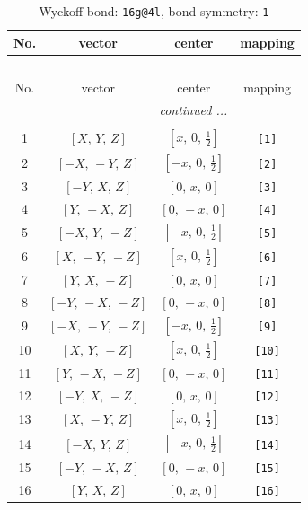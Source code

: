 \documentclass[fleqn,8pt]{jsarticle}
\begin{document}
\begin{longtable}{cccc}
\caption{Wyckoff bond: {\tt 16g@4l}, bond symmetry: {\tt 1}}
 \\
 \hline \hline
No. & vector & center & mapping \\ \hline \endfirsthead

\multicolumn{3}{l}{\tablename\ \thetable{}} \\
 \hline \hline
No. & vector & center & mapping \\ \hline \endhead

 \hline \hline
\multicolumn{3}{r}{\footnotesize\it continued ...} \\ \endfoot

 \hline \hline
\multicolumn{3}{r}{} \\ \endlastfoot

1 & $\left[ X,\, Y,\, Z \right]$ & $\left[ x,\, 0,\, \frac{1}{2} \right]$ & {\tt [1]} \\ \hline
2 & $\left[ - X,\, - Y,\, Z \right]$ & $\left[ - x,\, 0,\, \frac{1}{2} \right]$ & {\tt [2]} \\ \hline
3 & $\left[ - Y,\, X,\, Z \right]$ & $\left[ 0,\, x,\, 0 \right]$ & {\tt [3]} \\ \hline
4 & $\left[ Y,\, - X,\, Z \right]$ & $\left[ 0,\, - x,\, 0 \right]$ & {\tt [4]} \\ \hline
5 & $\left[ - X,\, Y,\, - Z \right]$ & $\left[ - x,\, 0,\, \frac{1}{2} \right]$ & {\tt [5]} \\ \hline
6 & $\left[ X,\, - Y,\, - Z \right]$ & $\left[ x,\, 0,\, \frac{1}{2} \right]$ & {\tt [6]} \\ \hline
7 & $\left[ Y,\, X,\, - Z \right]$ & $\left[ 0,\, x,\, 0 \right]$ & {\tt [7]} \\ \hline
8 & $\left[ - Y,\, - X,\, - Z \right]$ & $\left[ 0,\, - x,\, 0 \right]$ & {\tt [8]} \\ \hline
9 & $\left[ - X,\, - Y,\, - Z \right]$ & $\left[ - x,\, 0,\, \frac{1}{2} \right]$ & {\tt [9]} \\ \hline
10 & $\left[ X,\, Y,\, - Z \right]$ & $\left[ x,\, 0,\, \frac{1}{2} \right]$ & {\tt [10]} \\ \hline
11 & $\left[ Y,\, - X,\, - Z \right]$ & $\left[ 0,\, - x,\, 0 \right]$ & {\tt [11]} \\ \hline
12 & $\left[ - Y,\, X,\, - Z \right]$ & $\left[ 0,\, x,\, 0 \right]$ & {\tt [12]} \\ \hline
13 & $\left[ X,\, - Y,\, Z \right]$ & $\left[ x,\, 0,\, \frac{1}{2} \right]$ & {\tt [13]} \\ \hline
14 & $\left[ - X,\, Y,\, Z \right]$ & $\left[ - x,\, 0,\, \frac{1}{2} \right]$ & {\tt [14]} \\ \hline
15 & $\left[ - Y,\, - X,\, Z \right]$ & $\left[ 0,\, - x,\, 0 \right]$ & {\tt [15]} \\ \hline
16 & $\left[ Y,\, X,\, Z \right]$ & $\left[ 0,\, x,\, 0 \right]$ & {\tt [16]} \\
\end{longtable}
\end{document}
